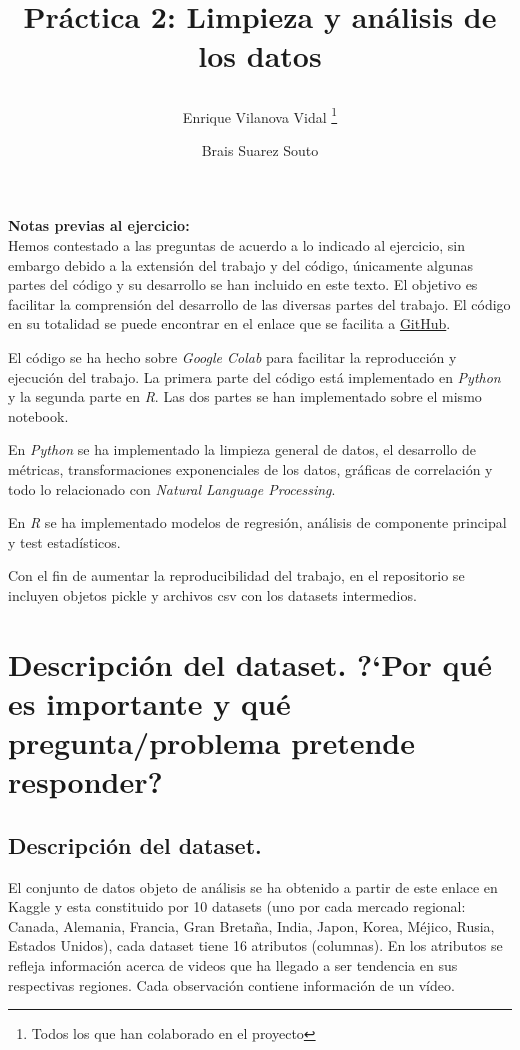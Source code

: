 \documentclass[a4paper,12pt]{article}
\title{%

Pr\'actica 2: Limpieza y an\'alisis de los datos
	
	\author{%
	Enrique Vilanova Vidal%
		\thanks{Todos los que han colaborado en el proyecto}
	\and Brais Suarez Souto
	}
}
\begin{document}
\maketitle
\thispagestyle{empty}
\clearpage
{} 
\newpage

\textbf{Notas previas al ejercicio:} \\

Hemos contestado a las preguntas de acuerdo a lo indicado al ejercicio, sin embargo debido a la extensi\'on del trabajo y del c\'odigo, \'unicamente algunas partes del c\'odigo y su desarrollo  se han incluido en este texto. El objetivo es facilitar la comprensi\'on del desarrollo de las diversas partes del trabajo. El c\'odigo en su totalidad se puede encontrar en el enlace que se facilita a  \href{https://github.com/b-suarez/youtube_stats_analysis}{GitHub}.

El c\'odigo se ha hecho sobre {\itshape Google Colab} para facilitar la reproducci\'on y ejecuci\'on del trabajo. La primera parte del c\'odigo est\'a implementado en {\itshape Python} y la segunda parte en {\itshape R}. Las dos partes se han implementado sobre el mismo notebook.

En {\itshape Python} se ha implementado la limpieza general de datos, el desarrollo de m\'etricas, transformaciones exponenciales de los datos, gr\'aficas de correlaci\'on y todo lo relacionado con {\itshape Natural Language Processing}.

En {\itshape R} se ha implementado modelos de regresi\'on, an\'alisis de componente principal y test estad\'isticos.

Con el fin de aumentar la reproducibilidad del  trabajo, en el repositorio se incluyen objetos pickle y archivos csv con los datasets intermedios.

\newpage
\section[item_descripcion]{Descripci\'on del dataset. ?`Por qu\'e es importante y qu\'e  pregunta/problema pretende responder?}

\subsection{Descripci\'on del dataset.}

El conjunto de datos objeto de an\'alisis se ha obtenido a partir de este enlace en Kaggle y esta constituido por 10 datasets (uno por cada mercado regional: Canada, Alemania, Francia, Gran Breta\~na, India, Japon, Korea, M\'ejico, Rusia, Estados Unidos), cada dataset tiene 16 atributos (columnas). En los atributos se refleja informaci\'on acerca de videos que ha llegado a ser tendencia en sus respectivas regiones. Cada observaci\'on contiene informaci\'on de un v\'ideo.
\end{document}
